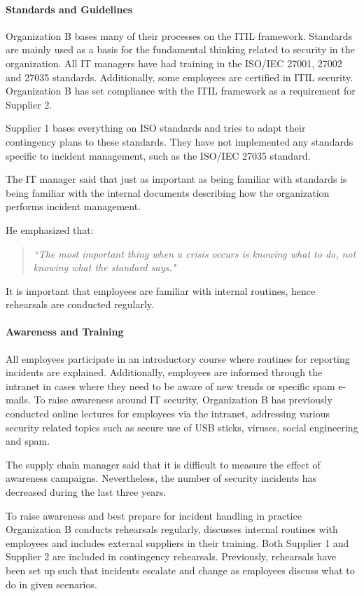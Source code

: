 \paragraph{Standards and Guidelines}
Organization B bases many of their processes on the ITIL framework. Standards are mainly used as a basis for the fundamental thinking related to security in the organization. All IT managers have had training in the ISO/IEC 27001, 27002 and 27035 standards. Additionally, some employees are certified in ITIL security. Organization B has set compliance with the \ac{ITIL} framework as a requirement for Supplier 2. %

Supplier 1 bases everything on \acs{ISO} standards and tries to adapt their contingency plans to these standards. They have not implemented any standards specific to incident management, such as the \acs{ISO}/\acs{IEC} 27035 standard. 

The IT manager said that just as important as being familiar with standards is being familiar with the internal documents describing how the organization performs incident management. 

He emphasized that:
\begin{quote}
\textit{``The most important thing when a crisis occurs is knowing what to do, not knowing what the standard says."}
\end{quote}
It is important that employees are familiar with internal routines, hence rehearsals are conducted regularly.

\paragraph{Awareness and Training}
All employees participate in an introductory course where routines for reporting incidents are explained. Additionally, employees are informed through the intranet in cases where they need to be aware of new trends or specific spam e-mails. To raise awareness around IT security, Organization B has previously conducted online lectures for employees via the intranet, addressing various security related topics such as secure use of USB sticks, viruses, social engineering and spam. 

The supply chain manager said that it is difficult to measure the effect of awareness campaigns. Nevertheless, the number of security incidents has decreased during the last three years. 

To raise awareness and best prepare for incident handling in practice Organization B conducts rehearsals regularly, discusses internal routines with employees and includes external suppliers in their training. Both Supplier 1 and Supplier 2 are included in contingency rehearsals. Previously, rehearsals have been set up such that incidents escalate and change as employees discuss what to do in given scenarios. 

